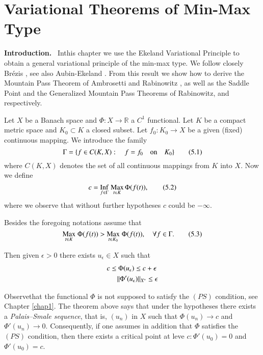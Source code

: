\chapter{Variational Theorems of Min-Max Type}\label{chap5}

\noindent
{\bf Introduction.}~ In\pageoriginale this chapter we use the Ekeland
Variational Principle to obtain a general variational principle of the
min-max type. We follow closely Br\'ezis \cite{key13}, see also
Aubin-Ekeland \cite{key6}. From this result we show how to derive the
Mountain Pass Theorem of Ambrosetti and Rabinowitz \cite{key4}, as
well as the Saddle Point and the Generalized Mountain Pass Theorems of
Rabinowitz, \cite{key66} and \cite{key67} respectively.

Let $X$ be a Banach space and $\Phi:X\to \mathbb{R}$ a $C^{1}$
functional. Let $K$ be a compact metric space and $K_{0}\subset K$ a
closed subset. Let $f_{0}:K_{0}\to X$ be a given (fixed) continuous
mapping. We introduce the family
\begin{equation*}
\Gamma=\{f\in C(K,X):\quad f=f_{0}\quad\text{on}\quad
K_{0}\}\tag{5.1}\label{chap5-eq5.1} 
\end{equation*}
where $C(K,X)$ denotes the set of all continuous mappings from $K$
into $X$. Now we define
\begin{equation*}
c={\displaystyle\mathop{\operatorname{Inf}}_{f\in
    \Gamma}}\;{\displaystyle{\mathop{\operatorname{Max}}_{t\in
      K}}}\,\Phi(f(t)),\tag{5.2}\label{chap5-eq5.2} 
\end{equation*}
where we observe that without further hypotheses $c$ could be
$-\infty$.

\begin{theorem}\label{chap5-thm5.1}
Besides the foregoing notations assume that
\begin{equation*}
{\displaystyle\mathop{\operatorname{Max}}_{t\in K}}\;\Phi(f(t))>{\displaystyle\mathop{\operatorname{Max}}_{t\in K_{0}}}\;\Phi(f(t)),\quad \forall f\in
\Gamma.\tag{5.3}\label{chap5-eq5.3} 
\end{equation*}

Then given $\epsilon>0$ there exists $u_{\epsilon}\in X$ such that
\begin{align*}
c &\leq \Phi(u_{\epsilon})\leq c+\epsilon\\
 &\quad ||\Phi'(u_{\epsilon})||_{X^{\ast}}\leq \epsilon
\end{align*}
\end{theorem}

\begin{remark*}
Observe\pageoriginale that the functional $\Phi$ is not supposed to
satisfy the $(PS)$ condition, see Chapter \ref{chap1}. The theorem
above says that under the hypotheses there exists a {\em Palais--Smale
  sequence}, that is, $(u_{n})$ in $X$ such that $\Phi(u_{n})\to c$
and $\Phi'(u_{n})\to 0$. Consequently, if one assumes in addition that
$\Phi$ satisfies the $(PS)$ condition, then there exists a critical
point at leve $c:\Phi'(u_{0})=0$ and $\Phi'(u_{0})=c$.
\end{remark*}

